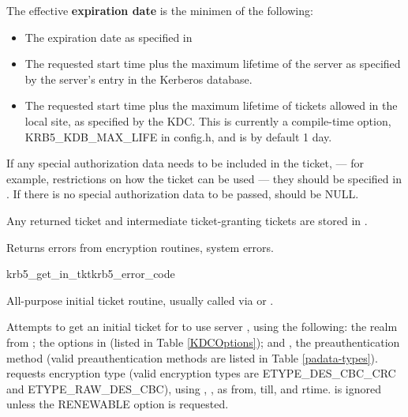 The effective {\bf expiration date} is the minimen of the following:
\begin{itemize}
\item The expiration date as specified in
\item The requested start time plus the maximum lifetime of the
server as specified by the server's entry in the
Kerberos database.
\item The requested start time plus the maximum lifetime of tickets
allowed in the local site, as specified by the KDC.
This is currently a compile-time option,
KRB5_KDB_MAX_LIFE in config.h, and is by default 1 day.
\end{itemize}

If any special authorization data needs to be included in the ticket,
--- for example, restrictions on how the ticket can be used --- 
they should be specified in .   If there
is no special authorization data to be passed,
 should be NULL.

Any returned ticket and intermediate ticket-granting tickets are
stored in .

Returns errors from encryption routines, system errors.

\begin{funcdecl}{krb5_get_in_tkt}{krb5_error_code}{\funcin}
\funcendfuncarg
{}
\funcendfuncarg
{}
\funcinout
{}
\end{funcdecl}

All-purpose initial ticket routine, usually called via
 or
.


Attempts to get an initial ticket for 
to use server , using the following:
the realm from ; the options in
 (listed in Table \ref{KDCOptions});
and , the preauthentication
method (valid preauthentication methods are listed in Table
\ref{padata-types}).
 requests encryption type
 (valid encryption types are ETYPE_DES_CBC_CRC and
ETYPE_RAW_DES_CBC),
using ,
,
as from, till, and rtime.   is
ignored unless the RENEWABLE option is requested.

